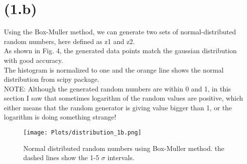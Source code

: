 \section{(1.b)}
Using the Box-Muller method, we can generate two sets of normal-distributed random numbers, here defined as z1 and z2.\\
As shown in Fig. 4, the generated data points match the gaussian distribution with good accuracy.\\
The histogram is normalized to one and the orange line shows the normal distribution from scipy package.\\
NOTE: Although the generated random numbers are within 0 and 1, in this section 
I saw that sometimes logarithm of the random values are positive,
which either means that the random generator is giving value bigger than 1, or the logarithm is doing something strange!



\begin{figure}[!htb]
  \centering
  \texttt{[image: Plots/distribution\_1b.png]}
  \caption{Normal distributed random numbers using Box-Muller method. the dashed lines show the 1-5 $\sigma$ intervals.}
  \label{fig:fig4}
\end{figure}


